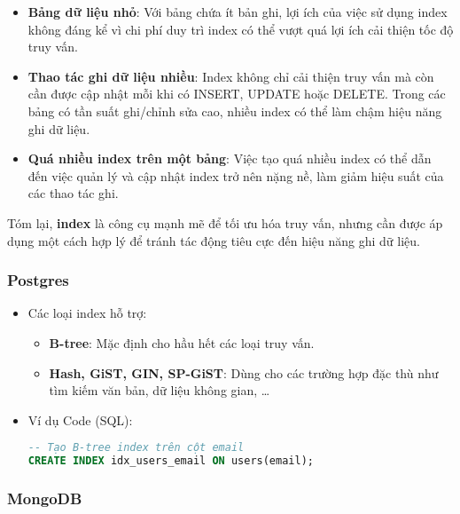\begin{itemize}
    \item \textbf{Bảng dữ liệu nhỏ}: Với bảng chứa ít bản ghi, lợi ích của việc sử dụng index không đáng kể vì chi phí duy trì index có thể vượt quá lợi ích cải thiện tốc độ truy vấn.
    \item \textbf{Thao tác ghi dữ liệu nhiều}: Index không chỉ cải thiện truy vấn mà còn cần được cập nhật mỗi khi có INSERT, UPDATE hoặc DELETE. Trong các bảng có tần suất ghi/chỉnh sửa cao, nhiều index có thể làm chậm hiệu năng ghi dữ liệu.
    \item \textbf{Quá nhiều index trên một bảng}: Việc tạo quá nhiều index có thể dẫn đến việc quản lý và cập nhật index trở nên nặng nề, làm giảm hiệu suất của các thao tác ghi.
\end{itemize}

Tóm lại, \textbf{index} là công cụ mạnh mẽ để tối ưu hóa truy vấn, nhưng cần được áp dụng một cách hợp lý để tránh tác động tiêu cực đến hiệu năng ghi dữ liệu.

\newpage
\subsubsection{Postgres}

\begin{itemize}
    \item Các loại index hỗ trợ:
    \begin{itemize}
        \item \textbf{B-tree}: Mặc định cho hầu hết các loại truy vấn.
        \item \textbf{Hash, GiST, GIN, SP-GiST}: Dùng cho các trường hợp đặc thù như tìm kiếm văn bản, dữ liệu không gian, …
    \end{itemize}
    \item Ví dụ Code (SQL):\begin{lstlisting}[language=sql]
-- Tạo B-tree index trên cột email
CREATE INDEX idx_users_email ON users(email);\end{lstlisting}
\end{itemize}

\subsubsection{MongoDB}

